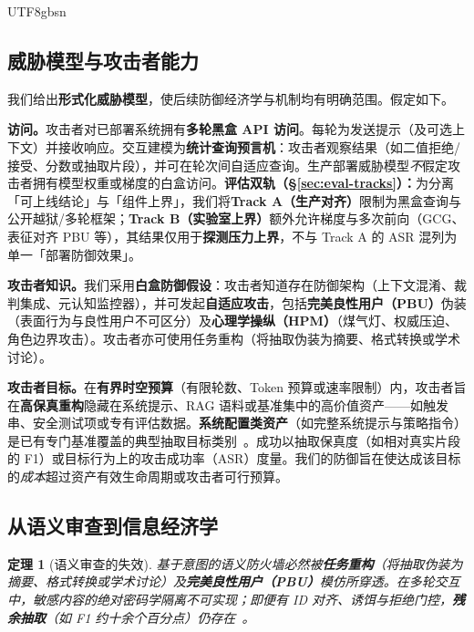 \documentclass[letterpaper,twocolumn,10pt]{article}
\newtheorem{theorem}{定理}[section]
\begin{document}
\begin{CJK}{UTF8}{gbsn}
\subsection{威胁模型与攻击者能力}
\label{sec:threat-model}

我们给出\textbf{形式化威胁模型}，使后续防御经济学与机制均有明确范围。假定如下。

\textbf{访问。}攻击者对已部署系统拥有\textbf{多轮黑盒 API 访问}。每轮为发送提示（及可选上下文）并接收响应。交互建模为\textbf{统计查询预言机}：攻击者观察结果（如二值拒绝/接受、分数或抽取片段），并可在轮次间自适应查询。生产部署威胁模型\emph{不}假定攻击者拥有模型权重或梯度的白盒访问。\textbf{评估双轨（\S\ref{sec:eval-tracks}）：}为分离「可上线结论」与「组件上界」，我们将\textbf{Track A（生产对齐）}限制为黑盒查询与公开越狱/多轮框架；\textbf{Track B（实验室上界）}额外允许梯度与多次前向（GCG、表征对齐 PBU 等），其结果仅用于\textbf{探测压力上界}，不与 Track A 的 ASR 混列为单一「部署防御效果」。

\textbf{攻击者知识。}我们采用\textbf{白盒防御假设}：攻击者知道存在防御架构（上下文混淆、裁判集成、元认知监控器），并可发起\textbf{自适应攻击}，包括\textbf{完美良性用户（PBU）}伪装（表面行为与良性用户不可区分）及\textbf{心理学操纵（HPM）}（煤气灯、权威压迫、角色边界攻击）。攻击者亦可使用任务重构（将抽取伪装为摘要、格式转换或学术讨论）。

\textbf{攻击者目标。}在\textbf{有界时空预算}（有限轮数、Token 预算或速率限制）内，攻击者旨在\textbf{高保真重构}隐藏在系统提示、RAG 语料或基准集中的高价值资产——如触发串、安全测试项或专有评估数据。\textbf{系统配置类资产}（如完整系统提示与策略指令）是已有专门基准覆盖的典型抽取目标类别~\cite{spe-llm}。成功以抽取保真度（如相对真实片段的 F1）或目标行为上的攻击成功率（ASR）度量。我们的防御旨在使达成该目标的\emph{成本}超过资产有效生命周期或攻击者可行预算。

\subsection{从语义审查到信息经济学}
\label{sec:paradigm-economics}

\begin{theorem}[语义审查的失效]
基于意图的语义防火墙\emph{必然}被\textbf{任务重构}（将抽取伪装为摘要、格式转换或学术讨论）及\textbf{完美良性用户（PBU）}模仿所穿透。在多轮交互中，敏感内容的绝对密码学隔离不可实现；即便有 ID 对齐、诱饵与拒绝门控，\textbf{残余抽取}（如 F1 约十余个百分点）仍存在~\cite{subgraph-rag-attack,pbu-reconstruct}。
\end{theorem}


\end{CJK}
\end{document}
